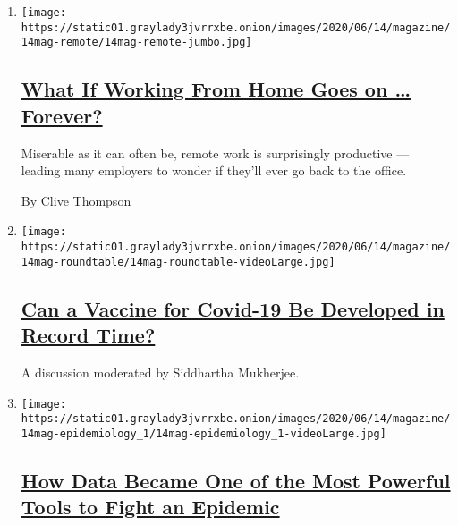 \begin{enumerate}
\def\labelenumi{\arabic{enumi}.}
\item
  \texttt{[image: https://static01.graylady3jvrrxbe.onion/images/2020/06/14/magazine/14mag-remote/14mag-remote-jumbo.jpg]}

  \hypertarget{what-if-working-from-home-goes-on--forever}{%
  \subsection{\texorpdfstring{\href{/interactive/2020/06/09/magazine/remote-work-covid.html}{What
  If Working From Home Goes on \ldots{}
  Forever?}}{What If Working From Home Goes on \ldots{} Forever?}}\label{what-if-working-from-home-goes-on--forever}}

  Miserable as it can often be, remote work is surprisingly productive
  --- leading many employers to wonder if they'll ever go back to the
  office.

  By Clive Thompson
\item
  \texttt{[image: https://static01.graylady3jvrrxbe.onion/images/2020/06/14/magazine/14mag-roundtable/14mag-roundtable-videoLarge.jpg]}

  \hypertarget{can-a-vaccine-for-covid-19-be-developed-in-record-time}{%
  \subsection{\texorpdfstring{\href{/interactive/2020/06/09/magazine/covid-vaccine.html}{Can
  a Vaccine for Covid-19 Be Developed in Record
  Time?}}{Can a Vaccine for Covid-19 Be Developed in Record Time?}}\label{can-a-vaccine-for-covid-19-be-developed-in-record-time}}

  A discussion moderated by Siddhartha Mukherjee.
\item
  \texttt{[image: https://static01.graylady3jvrrxbe.onion/images/2020/06/14/magazine/14mag-epidemiology\_1/14mag-epidemiology\_1-videoLarge.jpg]}

  \hypertarget{how-data-became-one-of-the-most-powerful-tools-to-fight-an-epidemic}{%
  \subsection{\texorpdfstring{\href{/interactive/2020/06/10/magazine/covid-data.html}{How
  Data Became One of the Most Powerful Tools to Fight an
  Epidemic}}{How Data Became One of the Most Powerful Tools to Fight an Epidemic}}\label{how-data-became-one-of-the-most-powerful-tools-to-fight-an-epidemic}}


\end{enumerate}
